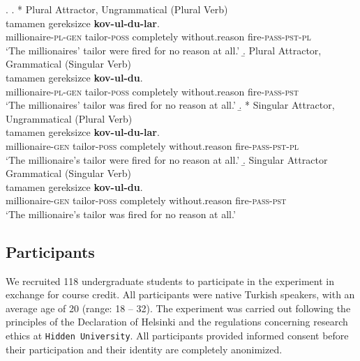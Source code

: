 \documentclass[apacite,linguex]{glossa}\usepackage[]{graphicx}\usepackage[]{color}
\begin{document}
\ex. \label{ex:our_items}
  \a. * Plural Attractor, Ungrammatical (Plural Verb) \label{ex:expitem-plpl}\\
   tamamen gereksizce \textbf{kov-ul-du-lar}.\\
  millionaire-\textsc{pl}-\textsc{gen} tailor-\textsc{poss} completely without.reason fire-\textsc{pass}-\textsc{pst}-\textsc{pl}\\
  \glt `The millionaires' tailor were fired for no reason at all.'
  \b. Plural Attractor, Grammatical (Singular Verb) \label{ex:expitem-plsg} \\
   tamamen gereksizce \textbf{kov-ul-du}.\\
  millionaire-\textsc{pl}-\textsc{gen} tailor-\textsc{poss} completely without.reason fire-\textsc{pass}-\textsc{pst}\\
  \glt `The millionaires' tailor was fired for no reason at all.'
  \b. * Singular Attractor, Ungrammatical (Plural Verb) \label{ex:expitem-sgpl}\\
   tamamen gereksizce \textbf{kov-ul-du-lar}.\\
  millionaire-\textsc{gen} tailor-\textsc{poss} completely without.reason fire-\textsc{pass}-\textsc{pst}-\textsc{pl}\\
  \glt `The millionaire's tailor were fired for no reason at all.'
  \b. Singular Attractor Grammatical (Singular Verb) \label{ex:expitem-sgsg}\\
   tamamen gereksizce \textbf{kov-ul-du}.\\
  millionaire-\textsc{gen} tailor-\textsc{poss} completely without.reason fire-\textsc{pass}-\textsc{pst}\\
  \glt `The millionaire's tailor was fired for no reason at all.'
  

\subsection{Participants} 


We recruited 118 undergraduate students to participate in the experiment in exchange for course credit. All participants were native Turkish speakers, with an average age of 20 (range: 18 -- 32). The experiment was carried out following the principles of the Declaration of Helsinki and the regulations concerning research ethics at \texttt{Hidden University}. All participants provided informed consent before their participation and their identity are completely anonimized.
\end{document}
